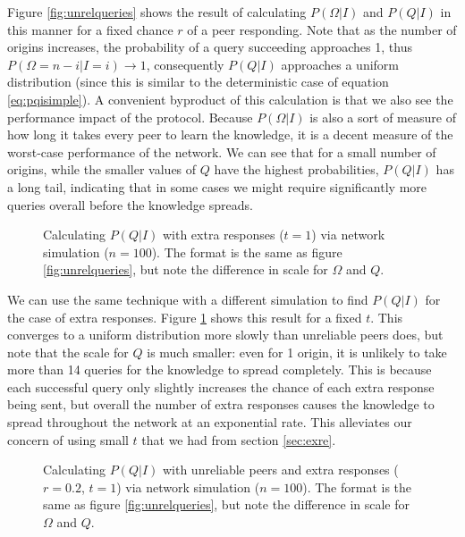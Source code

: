 \documentclass{article}
\newcommand{\eqnref}[1]{equation \eqref{eq:#1}}
\newcommand{\secref}[1]{section \ref{sec:#1}}
\newcommand{\figref}[1]{figure \ref{fig:#1}}
\newcommand{\Figref}[1]{Figure \ref{fig:#1}}
\begin{document}
\Figref{unrelqueries} shows the result of
calculating $P(\Omega|I)$ and $P(Q|I)$ in this manner for a fixed chance $r$ of
a peer responding. Note that as the number of origins increases, the probability
of a query succeeding approaches 1, thus $P(\Omega=n-i|I=i)\rightarrow 1$,
consequently $P(Q|I)$ approaches a uniform distribution (since this is similar
to the deterministic case of \eqnref{pqisimple}). A convenient byproduct of this
calculation is that we also see the performance impact of the protocol.
Because $P(\Omega|I)$ is also a sort of measure of how long it takes every peer
to learn the knowledge, it is a decent measure of the worst-case performance of
the network. We can see that for a small number of origins, while the smaller
values of $Q$ have the highest probabilities, $P(Q|I)$ has a long tail,
indicating that in some cases we might require significantly more queries
overall before the knowledge spreads.

\begin{figure}%
    \centering
	\caption{Calculating $P(Q|I)$ with extra responses ($t=1$) via network
	simulation ($n=100$). The format is the same as \figref{unrelqueries}, but
	note the difference in scale for $\Omega$ and $Q$.}
    \label{fig:exrequeries}%
\end{figure}

We can use the same technique with a different simulation to find $P(Q|I)$ for
the case of extra responses. \Figref{exrequeries} shows this result for a fixed $t$.
This converges to a uniform distribution more slowly than unreliable peers does,
but note that the scale for $Q$ is much smaller: even for 1 origin, it is
unlikely to take more than 14 queries for the knowledge to spread completely.
This is because each successful query only slightly increases the chance of each
extra response being sent, but overall the number of extra responses causes the
knowledge to spread throughout the network at an exponential rate. This
alleviates our concern of using small $t$ that we had from \secref{exre}.

\begin{figure}%
    \centering
	\caption{Calculating $P(Q|I)$ with unreliable peers and extra responses
	($r=0.2$, $t=1$) via network simulation ($n=100$). The format is the same
	as \figref{unrelqueries}, but note the difference in scale for $\Omega$ and
	$Q$.}
    \label{fig:unexrequeries}%
\end{figure}
\end{document}
